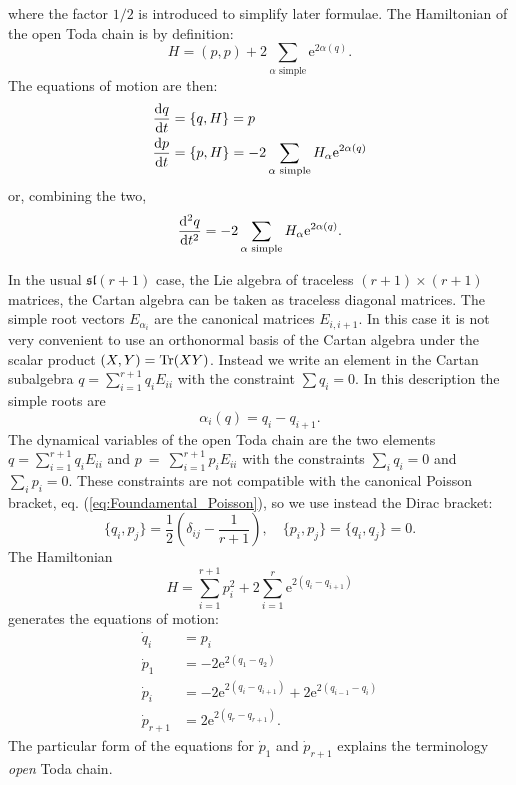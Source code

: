 where the factor $1/2$ is introduced to simplify later formulae.
The Hamiltonian of the open Toda chain is by definition:
\begin{equation}
    H = ( p, p ) + 2 \sum_{\alpha \text{ simple}} \mathrm{e}^{2\alpha(q)}.
\end{equation}
The equations of motion are then:
\begin{align}
    \dv{q}{t} &= \{ q , H \} = p \\
    \dv{p}{t} &= \{ p , H \} = - 2 \sum_{\alpha \text{ simple}} H_\alpha \mathrm{e}^{2\alpha(q)}
\end{align}
or, combining the two,
\begin{equation}
    \dv[2]{q}{t} = - 2 \sum_{\alpha \text{ simple}} H_\alpha \mathrm{e}^{2\alpha(q)}.
\end{equation}

In the usual $\mathfrak{sl}(r+1)$ case, the Lie algebra of traceless $(r+1) \times (r+1)$ matrices, the Cartan algebra can be taken as traceless diagonal matrices.
The simple root vectors $E_{\alpha_i}$ are the canonical matrices $E_{i, i+1}$.
In this case it is not very convenient to use an orthonormal basis of the Cartan algebra under the scalar product $ ( X,Y )  = \Tr(XY)$.
Instead we write an element in the Cartan subalgebra $q = \sum_{i=1}^{r+1} q_i E_{ii}$ with the constraint $\sum q_i = 0$. 
In this description the simple roots are 
\begin{equation}
    \alpha_i(q) = q_i - q_{i+1}.
\end{equation}
The dynamical variables of the open Toda chain are the two elements $q = \sum_{i = 1}^{r+1} q_i E_{ii}$ and $p~=~ \sum_{i=1}^{r+1}p_iE_{ii}$ with the constraints $\sum_i q_i = 0$ and $\sum_i p_i = 0$. These constraints are not compatible with the canonical Poisson bracket, eq. (\ref{eq:Foundamental_Poisson}), so we use instead the Dirac bracket:
\begin{equation}
    \{ q_i, p_j \} = \frac{1}{2} \left( \delta_{ij} - \frac{1}{r+1} \right), \quad \{ p_i, p_j \} = \{ q_i, q_j \} = 0.
\end{equation}
The Hamiltonian 
\begin{equation}
    H = \sum_{i=1}^{r+1} p_i^2 + 2 \sum_{i=1}^r \mathrm{e}^{2(q_i - q_{i+1})}
\end{equation}
generates the equations of motion:
\begin{align}
    \dot{q}_i &= p_i \\
    \dot{p}_1 &= - 2 \mathrm{e}^{2(q_1 - q_2)} \\
    \dot{p}_i &= - 2 \mathrm{e}^{2(q_{i} - q_{i+1})} + 2 \mathrm{e}^{2(q_{i-1} - q_{i})} \\
    \dot{p}_{r+1} &= 2 \mathrm{e}^{2(q_r - q_{r+1})}.
\end{align}
The particular form of the equations for $\dot{p}_1$ and $\dot{p}_{r+1}$ explains the terminology \textit{open} Toda chain.

